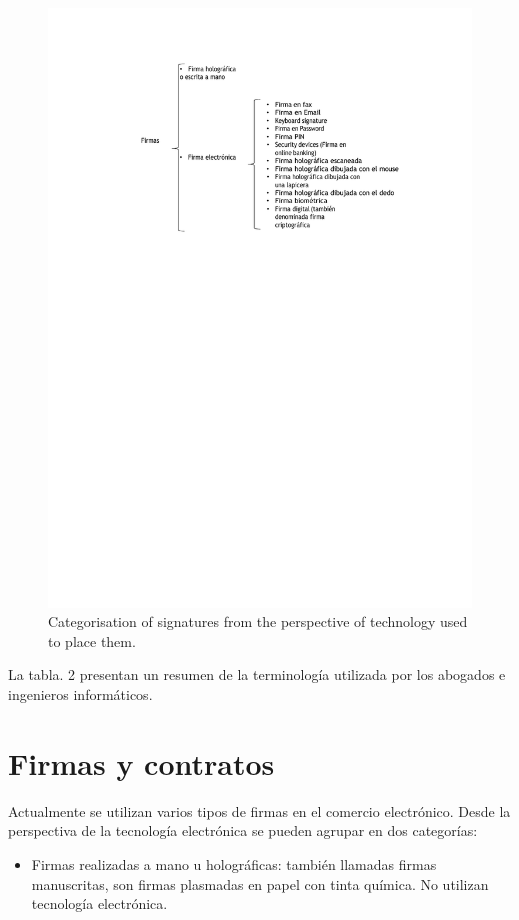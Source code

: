 \documentclass[12pt]{report} %
\begin{document}
\begin{itemize}
\begin{figure}
\centering
\includegraphics[width=0.85\columnwidth]{imagenes/cuadrollavefirmas.pdf}
\caption{Categorisation of signatures from the perspective of technology used to place them.}
\label{vusftollsbrgitmsd.pdf}
\end{figure} 

La tabla. 2 presentan un resumen de la terminología utilizada por los abogados e ingenieros informáticos.


\section{Firmas y contratos}

Actualmente se utilizan varios tipos de firmas en el comercio electrónico. Desde la perspectiva de la tecnología electrónica se pueden agrupar en dos categorías:

\begin{itemize}
    \item Firmas realizadas a mano u holográficas: también llamadas firmas manuscritas, son firmas plasmadas en papel con tinta química. No utilizan tecnología electrónica.
    

\end{itemize}
\end{itemize}
\end{document}
